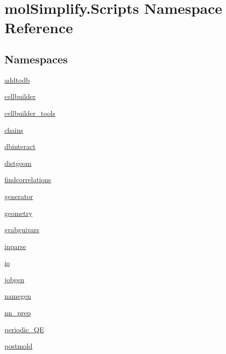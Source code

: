 \hypertarget{namespacemolSimplify_1_1Scripts}{}\section{mol\+Simplify.\+Scripts Namespace Reference}
\label{namespacemolSimplify_1_1Scripts}
\subsection*{Namespaces}
\begin{DoxyCompactItemize}
\item 
 \hyperlink{namespacemolSimplify_1_1Scripts_1_1addtodb}{addtodb}
\item 
 \hyperlink{namespacemolSimplify_1_1Scripts_1_1cellbuilder}{cellbuilder}
\item 
 \hyperlink{namespacemolSimplify_1_1Scripts_1_1cellbuilder__tools}{cellbuilder\+\_\+tools}
\item 
 \hyperlink{namespacemolSimplify_1_1Scripts_1_1chains}{chains}
\item 
 \hyperlink{namespacemolSimplify_1_1Scripts_1_1dbinteract}{dbinteract}
\item 
 \hyperlink{namespacemolSimplify_1_1Scripts_1_1distgeom}{distgeom}
\item 
 \hyperlink{namespacemolSimplify_1_1Scripts_1_1findcorrelations}{findcorrelations}
\item 
 \hyperlink{namespacemolSimplify_1_1Scripts_1_1generator}{generator}
\item 
 \hyperlink{namespacemolSimplify_1_1Scripts_1_1geometry}{geometry}
\item 
 \hyperlink{namespacemolSimplify_1_1Scripts_1_1grabguivars}{grabguivars}
\item 
 \hyperlink{namespacemolSimplify_1_1Scripts_1_1inparse}{inparse}
\item 
 \hyperlink{namespacemolSimplify_1_1Scripts_1_1io}{io}
\item 
 \hyperlink{namespacemolSimplify_1_1Scripts_1_1jobgen}{jobgen}
\item 
 \hyperlink{namespacemolSimplify_1_1Scripts_1_1namegen}{namegen}
\item 
 \hyperlink{namespacemolSimplify_1_1Scripts_1_1nn__prep}{nn\+\_\+prep}
\item 
 \hyperlink{namespacemolSimplify_1_1Scripts_1_1periodic__QE}{periodic\+\_\+\+QE}
\item 
 \hyperlink{namespacemolSimplify_1_1Scripts_1_1postmold}{postmold}
\item 

\end{DoxyCompactItemize}
